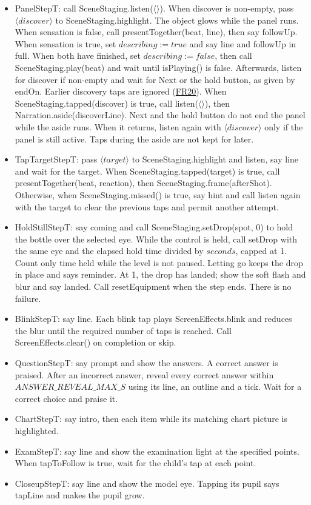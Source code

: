 \documentclass[10pt, titlepage]{article}
\newcommand{\srsurl}{https://team-hindsight.github.io/ophthamology-game/SRS/SRS.pdf}
\newcommand{\srsitemref}[2]{\href{\srsurl\#nameddest=#1}{#2}}
\newcommand{\T}[1]{\mathit{#1}}          %
\newcommand{\true}{\mathit{true}}
\newcommand{\false}{\mathit{false}}
\begin{document}
\begin{itemize}
\item PanelStepT: call SceneStaging.listen($\langle\rangle$). When discover
  is non-empty, pass $\langle\T{discover}\rangle$ to SceneStaging.highlight.
  The object glows while the panel runs. When sensation is false, call
  presentTogether(beat, line), then say followUp. When sensation is true,
  set $\T{describing} := \true$ and say line and followUp in full.
  When both have finished, set $\T{describing} := \false$, then call
  SceneStaging.play(beat) and wait until isPlaying() is false.
  Afterwards, listen for discover if non-empty
  and wait for Next or the hold button, as given by endOn. Earlier discovery
  taps are ignored (\srsitemref{FR_HoldSkip}{FR20}). When
  SceneStaging.tapped(discover) is true, call listen($\langle\rangle$),
  then Narration.aside(discoverLine). Next and the hold button do not end
  the panel while the aside runs. When it returns, listen again with
  $\langle\T{discover}\rangle$ only if the panel is still active. Taps during
  the aside are not kept for later.
\item TapTargetStepT: pass $\langle\T{target}\rangle$ to
  SceneStaging.highlight and listen, say line and wait for the target.
  When SceneStaging.tapped(target) is true, call presentTogether(beat,
  reaction), then SceneStaging.frame(afterShot). Otherwise, when
  SceneStaging.missed() is true, say hint and call listen again with
  the target to clear the previous taps and permit another attempt.
\item HoldStillStepT: say coming and call SceneStaging.setDrop(spot, 0)
  to hold the bottle over the selected eye. While the control is held,
  call setDrop with the same eye and the elapsed hold time divided by
  $\T{seconds}$, capped at 1. Count only time held while the level is not
  paused. Letting go keeps the drop in place and says reminder. At 1, the drop has landed;
  show the soft flash and blur and say landed. Call resetEquipment when
  the step ends. There is no failure.
\item BlinkStepT: say line. Each blink tap plays ScreenEffects.blink
  and reduces the blur until the required number of taps is reached.
  Call ScreenEffects.clear() on completion or skip.
\item QuestionStepT: say prompt and show the answers. A correct
  answer is praised. After an incorrect answer, reveal every correct
  answer within $\T{ANSWER\_REVEAL\_MAX\_S}$ using its line, an
  outline and a tick. Wait for a correct choice and praise it.
\item ChartStepT: say intro, then each item while its matching chart
  picture is highlighted.
\item ExamStepT: say line and show the examination light at the specified points.
  When tapToFollow is true, wait for the child's tap at each point.
\item CloseupStepT: say line and show the model eye. Tapping its pupil says
  tapLine and makes the pupil grow.
\end{itemize}
\end{document}
